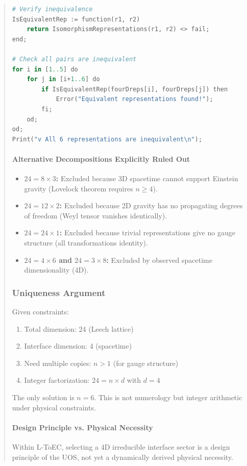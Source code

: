 \documentclass[11pt,titlepage]{article}
\begin{document}
\begin{abstract}
\begin{lstlisting}[language=Python,caption=GAP/Magma Verification of 4D Representations]
# Verify inequivalence
IsEquivalentRep := function(r1, r2)
    return IsomorphismRepresentations(r1, r2) <> fail;
end;

# Check all pairs are inequivalent
for i in [1..5] do
    for j in [i+1..6] do
        if IsEquivalentRep(fourDreps[i], fourDreps[j]) then
            Error("Equivalent representations found!");
        fi;
    od;
od;
Print("v All 6 representations are inequivalent\n");
\end{lstlisting}

\paragraph{Alternative Decompositions Explicitly Ruled Out}
\begin{itemize}
\item \textbf{$24 = 8 \times 3$:} Excluded because 3D spacetime cannot support Einstein gravity (Lovelock theorem requires $n \geq 4$).

\item \textbf{$24 = 12 \times 2$:} Excluded because 2D gravity has no propagating degrees of freedom (Weyl tensor vanishes identically).

\item \textbf{$24 = 24 \times 1$:} Excluded because trivial representations give no gauge structure (all transformations identity).

\item \textbf{$24 = 4 \times 6$ and $24 = 3 \times 8$:} Excluded by observed spacetime dimensionality (4D).
\end{itemize}

\subsubsection{Uniqueness Argument}
Given constraints:
\begin{enumerate}
\item Total dimension: 24 (Leech lattice)
\item Interface dimension: 4 (spacetime)
\item Need multiple copies: $n > 1$ (for gauge structure)
\item Integer factorization: $24 = n \times d$ with $d = 4$
\end{enumerate}

The only solution is $n = 6$. This is not numerology but integer arithmetic under physical constraints.

\paragraph{Design Principle vs. Physical Necessity} Within L-ToEC, selecting a 4D irreducible interface sector is a design principle of the UOS, not yet a dynamically derived physical necessity.\n


\end{abstract}
\end{document}
